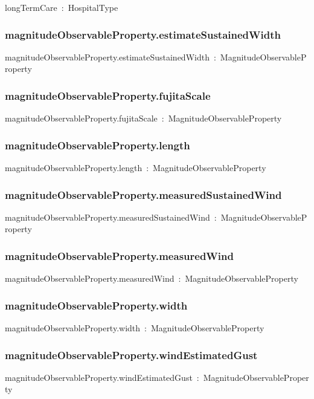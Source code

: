 \documentclass{article}
\begin{document}
longTermCare~:~HospitalType

\subsubsection*{magnitudeObservableProperty.estimateSustainedWidth}

magnitudeObservableProperty.estimateSustainedWidth~:~MagnitudeObservableProperty

\subsubsection*{magnitudeObservableProperty.fujitaScale}

magnitudeObservableProperty.fujitaScale~:~MagnitudeObservableProperty

\subsubsection*{magnitudeObservableProperty.length}

magnitudeObservableProperty.length~:~MagnitudeObservableProperty

\subsubsection*{magnitudeObservableProperty.measuredSustainedWind}

magnitudeObservableProperty.measuredSustainedWind~:~MagnitudeObservableProperty

\subsubsection*{magnitudeObservableProperty.measuredWind}

magnitudeObservableProperty.measuredWind~:~MagnitudeObservableProperty

\subsubsection*{magnitudeObservableProperty.width}

magnitudeObservableProperty.width~:~MagnitudeObservableProperty

\subsubsection*{magnitudeObservableProperty.windEstimatedGust}

magnitudeObservableProperty.windEstimatedGust~:~MagnitudeObservableProperty
\end{document}
